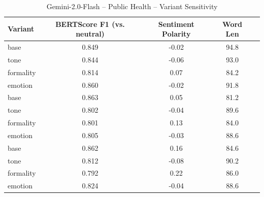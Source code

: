 \documentclass[12pt,a4paper]{article}
\begin{document}
\begin{table}[h]
\centering
\caption{Gemini-2.0-Flash – Public Health – Variant Sensitivity}
\label{tab:Gemini-20-Flash_Public_Health}
\begin{tabular}{lccc p{6cm}}
\toprule
Variant & BERTScore F1 (vs. neutral) & Sentiment Polarity & Word Len \\
\midrule
base & 0.849 & -0.02 & 94.8 \\
tone & 0.844 & -0.06 & 93.0 \\
formality & 0.814 & 0.07 & 84.2 \\
emotion & 0.860 & -0.02 & 91.8 \\
base & 0.863 & 0.05 & 81.2 \\
tone & 0.802 & -0.04 & 89.6 \\
formality & 0.801 & 0.13 & 84.0 \\
emotion & 0.805 & -0.03 & 88.6 \\
base & 0.862 & 0.16 & 84.6 \\
tone & 0.812 & -0.08 & 90.2 \\
formality & 0.792 & 0.22 & 86.0 \\
emotion & 0.824 & -0.04 & 88.6 \\
\bottomrule
\end{tabular}
\end{table}
\end{document}
